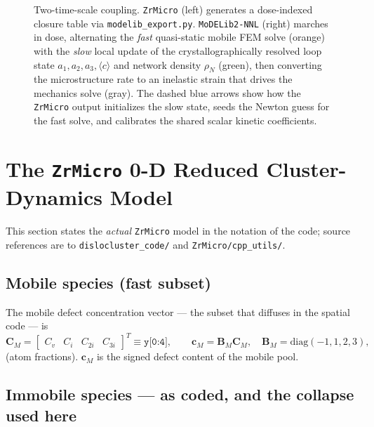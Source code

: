 \documentclass[11pt]{article}
\newcommand{\CM}{\mathbf{C}_{M}}
\newcommand{\cM}{\mathbf{c}_{M}}
\newcommand{\BM}{\mathbf{B}_{M}}
\newcommand{\ZrMicro}{\texttt{ZrMicro}}
\newcommand{\MoDELib}{\texttt{MoDELib2-NNL}}
\newcommand{\code}[1]{\texttt{#1}}
\begin{document}
\begin{figure}[h!]
\caption{Two-time-scale coupling. \ZrMicro{} (left) generates a dose-indexed
closure table via \code{modelib\_export.py}. \MoDELib{} (right) marches in dose,
alternating the \emph{fast} quasi-static mobile FEM solve (orange) with the
\emph{slow} local update of the crystallographically resolved loop state
$a_1,a_2,a_3,\langle c\rangle$ and network density $\rho_N$ (green), then
converting the microstructure rate to an inelastic strain that drives the
mechanics solve (gray). The dashed blue arrows show how the \ZrMicro{} output
initializes the slow state, seeds the Newton guess for the fast solve, and
calibrates the shared scalar kinetic coefficients.}
\label{fig:schematic}
\end{figure}

\section{The \texttt{ZrMicro} 0-D Reduced Cluster-Dynamics Model}
\label{sec:zrmicro}

This section states the \emph{actual} \ZrMicro{} model in the notation of the
code; source references are to \code{dislocluster\_code/} and
\code{ZrMicro/cpp\_utils/}.

\subsection{Mobile species (fast subset)}

The mobile defect concentration vector --- the subset that diffuses in the
spatial code --- is
\begin{equation}
\label{eq:zr_mobile}
    \CM = \begin{bmatrix} C_{v} & C_{i} & C_{2i} & C_{3i}\end{bmatrix}^{T}
    \equiv \texttt{y[0:4]},
    \qquad
    \cM = \BM \CM,
    \quad
    \BM=\mathrm{diag}(-1,1,2,3),
\end{equation}
(atom fractions). $\cM$ is the signed defect content of the mobile pool.

\subsection{Immobile species --- as coded, and the collapse used here}
\label{sec:immobile_coded}
\end{document}
